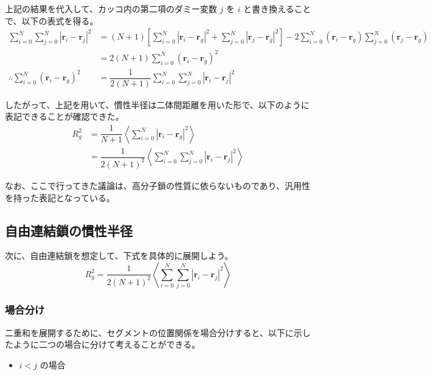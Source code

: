 \documentclass[a4paper,11pt]{ltjsarticle}
\begin{document}
\begin{appendix}
上記の結果を代入して、カッコ内の第二項のダミー変数 $j$ を $i$ と書き換えることで、以下の表式を得る。
\begin{align*}
\sum_{i = 0}^N \sum_{j=0}^N \left| \bm{r}_i - \bm{r}_j \right|^2
	&= (N + 1) \left[ \sum_{i=0}^N \left| \bm{r}_i - \bm{r}_g \right|^2 + \sum_{j=0}^N \left| \bm{r}_j - \bm{r}_g \right|^2 \right] -2 \sum_{i=0}^N (\bm{r}_i - \bm{r}_g) \sum_{j=0}^N (\bm{r}_j - \bm{r}_g) \\
	&= 2(N + 1) \sum_{i=0}^N (\bm{r}_i- \bm{r}_g)^2 \\
\therefore \sum_{i=0}^N (\bm{r}_i- \bm{r}_g)^2 
	&= \dfrac{1}{2(N+1)} \sum_{i = 0}^N \sum_{j=0}^N \left| \bm{r}_i - \bm{r}_j \right|^2
\end{align*}

したがって、上記を用いて、慣性半径は二体間距離を用いた形で、以下のように表記できることが確認できた。
\begin{align*}
R_g^2 
	&= \dfrac{1}{N+1} \left\langle \sum_{i=0}^{N} |\bm{r}_i - \bm{r}_g|^2 \right\rangle \\
	&= \dfrac{1}{2(N+1)^2} \left \langle \sum_{i=0}^N \sum_{j=0}^N \left| \bm{r}_i - \bm{r}_j \right|^2 \right \rangle
\end{align*}

なお、ここで行ってきた議論は、高分子鎖の性質に依らないものであり、汎用性を持った表記となっている。

\subsection{自由連結鎖の慣性半径}

次に、自由連結鎖を想定して、下式を具体的に展開しよう。
\begin{equation*}
R_g^2 = \dfrac{1}{2(N+1)^2} \left \langle \sum_{i=0}^N \sum_{j=0}^N \left| \bm{r}_i - \bm{r}_j \right|^2 \right \rangle
\end{equation*}

\subsubsection{場合分け}

二重和を展開するために、セグメントの位置関係を場合分けすると、以下に示したように二つの場合に分けて考えることができる。

\begin{itemize}
\item
$i < j$ の場合



\end{itemize}
\end{appendix}
\end{document}
